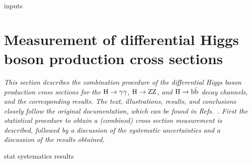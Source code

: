 {inputs}

\section{Measurement of differential Higgs boson production cross sections}
\label{sec:diffxs}

\emph{%
This section describes the combination procedure of the differential Higgs boson production cross sections for the $\mathrm{H}\to\mathrm{\gamma}\mathrm{\gamma}$, $\mathrm{H}\to\mathrm{Z}\mathrm{Z}$, and $\mathrm{H}\to\mathrm{b}\bar{\mathrm{b}}$ decay channels, and the corresponding results. The text, illustrations, results, and conclusions closely follow the original documentation, which can be found in Refs.~\cite{AN-17-244,HIG-17-028}. First the statistical procedure to obtain a (combined) cross section measurement is described, followed by a discussion of the systematic uncertainties and a discussion of the results obtained.
}

{stat}
{systematics}
{results}
